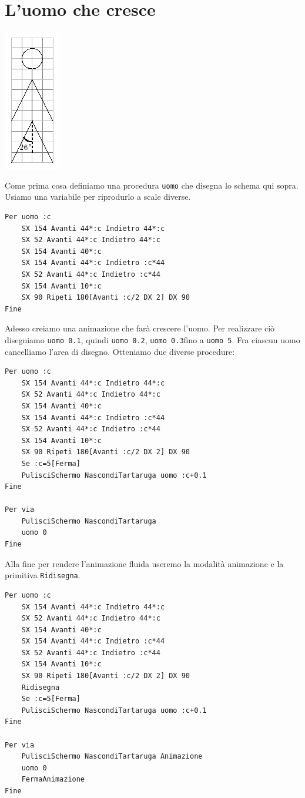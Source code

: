 \section{L'uomo che cresce}
\begin{center}
	\includegraphics{pics/animation-bonhomme.png}
\end{center}
Come prima cosa definiamo una procedura \texttt{uomo} che disegna lo schema qui sopra. Usiamo una variabile per riprodurlo a scale diverse.
\begin{lstlisting}[caption="Disegno di un uomo stilizzato"]
Per uomo :c
	SX 154 Avanti 44*:c Indietro 44*:c 
	SX 52 Avanti 44*:c Indietro 44*:c 
	SX 154 Avanti 40*:c
	SX 154 Avanti 44*:c Indietro :c*44 
	SX 52 Avanti 44*:c Indietro :c*44 
	SX 154 Avanti 10*:c
	SX 90 Ripeti 180[Avanti :c/2 DX 2] DX 90
Fine
\end{lstlisting}


Adesso creiamo una animazione che farà crescere l'uomo. Per realizzare ciò disegniamo \texttt{uomo 0.1}, quindi \texttt{uomo 0.2}, \texttt{uomo 0.3}\textellipsis fino a \texttt{uomo 5}. Fra ciascun uomo cancelliamo l'area di disegno. Otteniamo due diverse procedure:
\begin{lstlisting}[caption="Disegno di un uomo che cresce"]
Per uomo :c
	SX 154 Avanti 44*:c Indietro 44*:c 
	SX 52 Avanti 44*:c Indietro 44*:c 
	SX 154 Avanti 40*:c
	SX 154 Avanti 44*:c Indietro :c*44 
	SX 52 Avanti 44*:c Indietro :c*44 
	SX 154 Avanti 10*:c
	SX 90 Ripeti 180[Avanti :c/2 DX 2] DX 90
	Se :c=5[Ferma]
	PulisciSchermo NascondiTartaruga uomo :c+0.1
Fine

Per via
	PulisciSchermo NascondiTartaruga
	uomo 0
Fine
\end{lstlisting}

Alla fine per rendere l'animazione fluida useremo la modalità animazione e la primitiva \texttt{Ridisegna}.
\begin{lstlisting}[caption="Animazione di un uomo che cresce"]
Per uomo :c
	SX 154 Avanti 44*:c Indietro 44*:c 
	SX 52 Avanti 44*:c Indietro 44*:c 
	SX 154 Avanti 40*:c
	SX 154 Avanti 44*:c Indietro :c*44 
	SX 52 Avanti 44*:c Indietro :c*44 
	SX 154 Avanti 10*:c
	SX 90 Ripeti 180[Avanti :c/2 DX 2] DX 90
	Ridisegna
	Se :c=5[Ferma]
	PulisciSchermo NascondiTartaruga uomo :c+0.1
Fine

Per via
	PulisciSchermo NascondiTartaruga Animazione
	uomo 0
	FermaAnimazione
Fine
\end{lstlisting}

